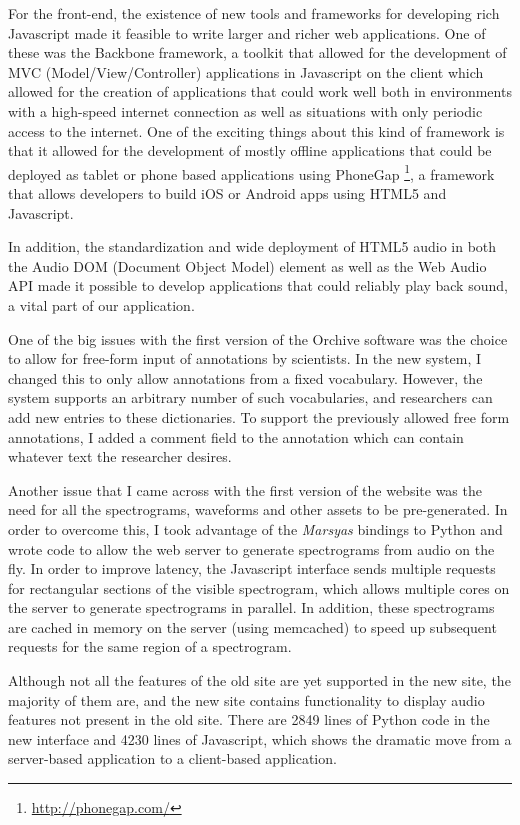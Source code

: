 For the front-end, the existence of new tools and frameworks for
developing rich Javascript made it feasible to write larger and richer
web applications.  One of these was the Backbone framework, a toolkit
that allowed for the development of MVC (Model/View/Controller)
applications in Javascript on the client which allowed for the
creation of applications that could work well both in environments
with a high-speed internet connection as well as situations with only
periodic access to the internet.  One of the exciting things about
this kind of framework is that it allowed for the development of
mostly offline applications that could be deployed as tablet or phone
based applications using
PhoneGap \footnote{\url{http://phonegap.com/}}, a framework that
allows developers to build iOS or Android apps using HTML5 and
Javascript.

In addition, the standardization and wide deployment of HTML5 audio in
both the Audio DOM (Document Object Model) element as well as the Web
Audio API made it possible to develop applications that could reliably
play back sound, a vital part of our application.

One of the big issues with the first version of the Orchive software
was the choice to allow for free-form input of annotations by
scientists.  In the new system, I changed this to only allow
annotations from a fixed vocabulary.  However, the system supports an
arbitrary number of such vocabularies, and researchers can add new
entries to these dictionaries.  To support the previously allowed free
form annotations, I added a comment field to the annotation which can
contain whatever text the researcher desires.

Another issue that I came across with the first version of the
website was the need for all the spectrograms, waveforms and other
assets to be pre-generated.  In order to overcome this, I took
advantage of the \textit{Marsyas} bindings to Python and wrote code to allow
the web server to generate spectrograms from audio on the fly.  In
order to improve latency, the Javascript interface sends multiple
requests for rectangular sections of the visible spectrogram, which
allows multiple cores on the server to generate spectrograms in
parallel.  In addition, these spectrograms are cached in memory on the
server (using memcached) to speed up subsequent requests for the same
region of a spectrogram.

Although not all the features of the old site are yet supported in the
new site, the majority of them are, and the new site contains
functionality to display audio features not present in the old site.
There are 2849 lines of Python code in the new interface and 4230
lines of Javascript, which shows the dramatic move from a server-based
application to a client-based application.

